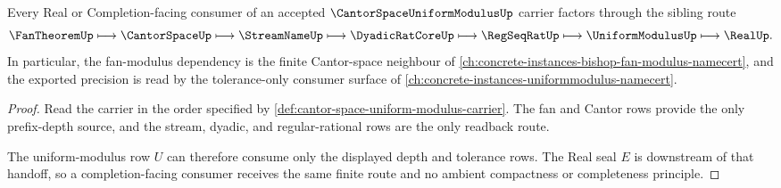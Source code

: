 \begin{theorem}
\label{thm:cantor-space-uniform-modulus-sibling-route}
Every Real or Completion-facing consumer of an accepted $\CantorSpaceUniformModulusUp$ carrier factors through the sibling route
$$
\FanTheoremUp \longmapsto \CantorSpaceUp \longmapsto \StreamNameUp \longmapsto \DyadicRatCoreUp \longmapsto \RegSeqRatUp \longmapsto \UniformModulusUp \longmapsto \RealUp .
$$
In particular, the fan-modulus dependency is the finite Cantor-space neighbour of \autoref{ch:concrete-instances-bishop-fan-modulus-namecert}, and the exported precision is read by the tolerance-only consumer surface of \autoref{ch:concrete-instances-uniformmodulus-namecert}.
\end{theorem}
\begin{proof}
Read the carrier in the order specified by \autoref{def:cantor-space-uniform-modulus-carrier}. The fan and Cantor rows provide the only prefix-depth source, and the stream, dyadic, and regular-rational rows are the only readback route.

The uniform-modulus row $U$ can therefore consume only the displayed depth and tolerance rows. The Real seal $E$ is downstream of that handoff, so a completion-facing consumer receives the same finite route and no ambient compactness or completeness principle.
\end{proof}




